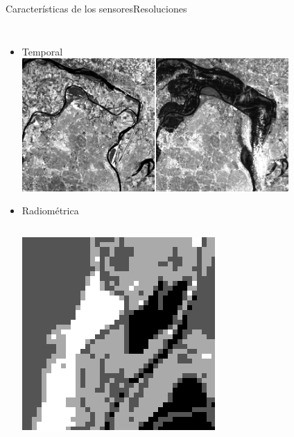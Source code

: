 \documentclass{beamer}
\begin{document}
\begin{frame}{Características de los sensores}{Resoluciones}
\begin{columns}[t]
\begin{itemize}
		\item Temporal \\
		\includegraphics[width=0.8\textwidth]{IMGs/res_temp}
		\item Radiométrica
		\begin{columns}
			\includegraphics[width=1\textwidth]{IMGs/res_rad2}

\end{columns}
\end{itemize}
\end{columns}
\end{frame}
\end{document}
